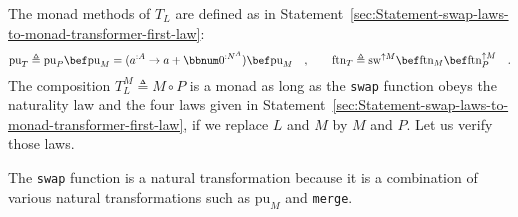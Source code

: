 The monad methods of $T_{L}$ are defined as in Statement~\ref{sec:Statement-swap-laws-to-monad-transformer-first-law}:
\[
\text{pu}_{T}\triangleq\text{pu}_{P}\bef\text{pu}_{M}=(a^{:A}\rightarrow a+\bbnum 0^{:N^{A}})\bef\text{pu}_{M}\quad,\quad\quad\text{ftn}_{T}\triangleq\text{sw}^{\uparrow M}\bef\text{ftn}_{M}\bef\text{ftn}_{P}^{\uparrow M}\quad.
\]
The composition $T_{L}^{M}\triangleq M\circ P$ is a monad as long
as the \lstinline!swap! function obeys the naturality law and the
four laws given in Statement~\ref{sec:Statement-swap-laws-to-monad-transformer-first-law},
if we replace $L$ and $M$ by $M$ and $P$. Let us verify those
laws.

The \lstinline!swap! function is a natural transformation because
it is a combination of various natural transformations such as $\text{pu}_{M}$
and \lstinline!merge!.

